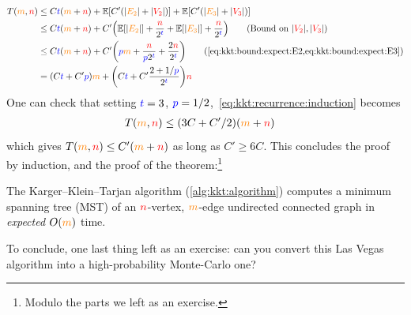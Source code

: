 \begin{align}
    T(\orange{m},\red{n})
    &\leq C \blue{t}(\orange{m}+\red{n})
+ \expect{C'(|\orange{E_2}| + |\red{V_2}|)} + \expect{C'(|\orange{E_3}| + |\red{V_3}|)} \notag\\
&\leq C \blue{t}(\orange{m}+\red{n})
+ C'\Paren{\expect{|\orange{E_2}|} + \frac{\red{n}}{2^{\blue{t}}} + \expect{|\orange{E_3}|} + \frac{\red{n}}{2^{\blue{t}}} } \tag{Bound on $|\red{V_2}|,|\red{V_3}|$} \notag\\
&\leq C \blue{t}(\orange{m}+\red{n})
+ C'\Paren{\blue{p}\orange{m} + \frac{\red{n}}{\blue{p}2^{\blue{t}}} + \frac{2\red{n}}{2^{\blue{t}}} } \tag{\cref{eq:kkt:bound:expect:E2,eq:kkt:bound:expect:E3}} \notag\\
&= (C \blue{t}+C'\blue{p})\orange{m} + \Paren{C \blue{t}+C'\frac{2+1/\blue{p}}{2^{\blue{t}}}}\red{n} \label{eq:kkt:recurrence:induction}
\end{align} %
One can check that setting $\textcolor{blue}{t}=3$, $\textcolor{blue}{p}=1/2$,~\cref{eq:kkt:recurrence:induction} becomes
\begin{align*}
    T(\textcolor{orange}{m},\textcolor{red}{n})
&\leq (3C+C'/2)( \textcolor{orange}{m}+ \textcolor{red}{n} )
\end{align*}
which gives $T(\textcolor{orange}{m},\textcolor{red}{n}) \leq C' ( \textcolor{orange}{m}+ \textcolor{red}{n} )$ as long as $C' \geq 6C$. This concludes the proof by induction, and the proof of the theorem:\footnote{Modulo the parts we left as an exercise.}
\begin{theorem}
    \label{theo:kkt}
    The Karger--Klein--Tarjan algorithm (\cref{alg:kkt:algorithm}) computes a minimum spanning tree (MST) of an $\textcolor{red}{n}$-vertex, $\textcolor{orange}{m}$-edge undirected connected graph in \emph{expected} $\bigO{\orange{m}}$ time.
\end{theorem}
\noindent To conclude, one last thing left as an exercise: can you convert this Las Vegas algorithm into a high-probability Monte-Carlo one?